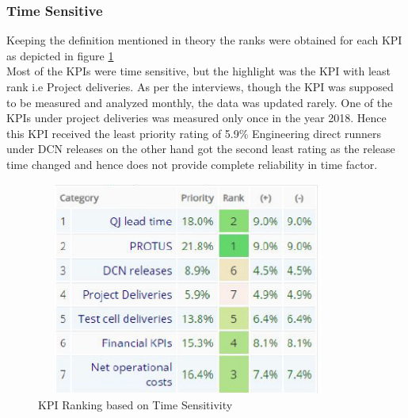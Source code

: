\subsubsection{Time Sensitive}
Keeping the definition mentioned in theory the ranks were obtained for each KPI as depicted in figure \ref{fig:6.4}\\


Most of the KPIs were time sensitive, but the highlight was the KPI with least rank i.e Project deliveries. As per the interviews, though the KPI was supposed to be measured and analyzed monthly, the data was updated rarely. One of the KPIs under project deliveries was measured only once in the year 2018. Hence this KPI received the least priority rating of 5.9\%
Engineering direct runners under DCN releases on the other hand got the second least rating as the release time changed and hence does not provide complete reliability in time factor. \\
\begin{figure}[H]
    \centering
    \captionsetup{justification=centering, margin=2cm}
    \vspace{1cm}
    \includegraphics[width=10cm, height=7cm]{figure/auxiliary/fig64.PNG}
    \caption{ KPI Ranking based on Time Sensitivity}
    \label{fig:6.4}
\end{figure}


